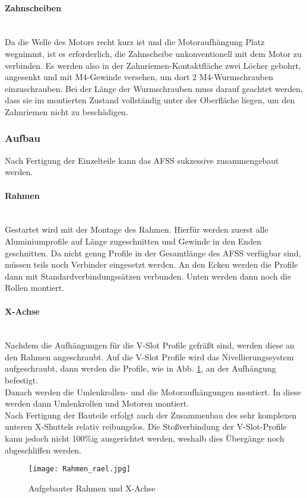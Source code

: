 \paragraph{Zahnscheiben}\mbox{}\\
Da die Welle des Motors recht kurz ist und die Motoraufhängung Platz wegnimmt, ist es erforderlich, die Zahnscheibe unkonventionell mit dem Motor zu verbinden. Es werden also in der Zahnriemen-Kontaktfläche zwei Löcher gebohrt, angesenkt und mit M4-Gewinde versehen, um dort 2 M4-Wurmschrauben einzuschrauben. Bei der Länge der Wurmschrauben muss darauf geachtet werden, dass sie im montierten Zustand vollständig unter der Oberfläche liegen, um den Zahnriemen nicht zu beschädigen.

\begin{minipage}{\textwidth}
\subsubsection{Aufbau}

Nach Fertigung der Einzelteile kann das AFSS sukzessive zusammengebaut werden.

\paragraph{Rahmen} \mbox{}\\
Gestartet wird mit der Montage des Rahmen. Hierfür werden zuerst alle Aluminiumprofile auf Länge zugeschnitten und Gewinde in den Enden geschnitten. Da nicht genug Profile in der Gesamtlänge des AFSS verfügbar sind, müssen teils noch Verbinder eingesetzt werden. An den Ecken werden die Profile dann mit Standardverbindungssätzen verbunden. Unten werden dann noch die Rollen montiert.

\paragraph{X-Achse} \mbox{}\\
Nachdem die Aufhängungen für die V-Slot Profile gefräßt sind, werden diese an den Rahmen angeschraubt. Auf die V-Slot Profile wird das Nivellierungssystem aufgeschraubt, dann werden die Profile, wie in Abb. \ref{ramreal}, an der Aufhängung befestigt. \\
Danach werden die Umlenkrollen- und die Motoraufhängungen montiert. In diese werden dann Umlenkrollen und Motoren montiert. \\
Nach Fertigung der Bauteile erfolgt auch der Zusammenbau des sehr komplexen unteren X-Shuttels relativ reibungslos. Die Stoßverbindung der V-Slot-Profile kann jedoch nicht 100\%ig ausgerichtet werden, weshalb dies Übergänge noch abgeschliffen werden.


\begin{figure}[H]
    \centering
    \texttt{[image: Rahmen\_rael.jpg]}
    \caption{Aufgebauter Rahmen und X-Achse}
    \label{ramreal}
\end{figure}

\end{minipage}


